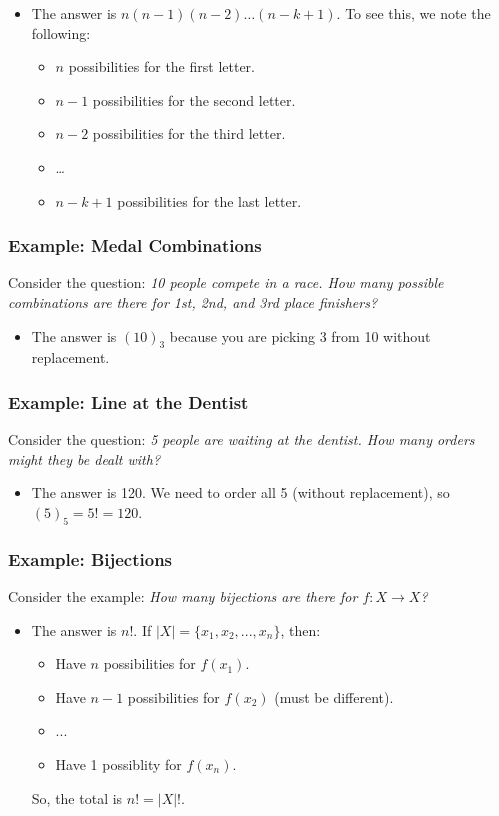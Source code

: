 \documentclass[letterpaper]{article}
\begin{document}
\begin{itemize}
    \item The answer is $n(n - 1)(n - 2)\dots(n - k + 1)$. To see this, we note the following:
    \begin{itemize}
        \item $n$ possibilities for the first letter.
        \item $n - 1$ possibilities for the second letter.
        \item $n - 2$ possibilities for the third letter.
        \item \dots
        \item $n - k + 1$ possibilities for the last letter.
    \end{itemize}
\end{itemize}

\subsubsection{Example: Medal Combinations}
Consider the question: \emph{10 people compete in a race. How many possible combinations are there for 1st, 2nd, and 3rd place finishers?} 

\begin{itemize}
    \item The answer is $(10)_3$ because you are picking 3 from 10 without replacement.
\end{itemize}

\subsubsection{Example: Line at the Dentist}
Consider the question: \emph{5 people are waiting at the dentist. How many orders might they be dealt with?} 

\begin{itemize}
    \item The answer is 120. We need to order all 5 (without replacement), so $(5)_5 = 5! = 120$.
\end{itemize}

\subsubsection*{Example: Bijections}
Consider the example: \emph{How many bijections are there for $f: X \to X$?} 

\begin{itemize}
    \item The answer is $n!$. If $|X| = \{x_1, x_2, ..., x_n\}$, then:
    \begin{itemize}
        \item Have $n$ possibilities for $f(x_1)$.
        \item Have $n - 1$ possibilities for $f(x_2)$ (must be different).
        \item ... 
        \item Have 1 possiblity for $f(x_n)$.
    \end{itemize}
    So, the total is $n! = |X|!$. 
\end{itemize}
\end{document}
